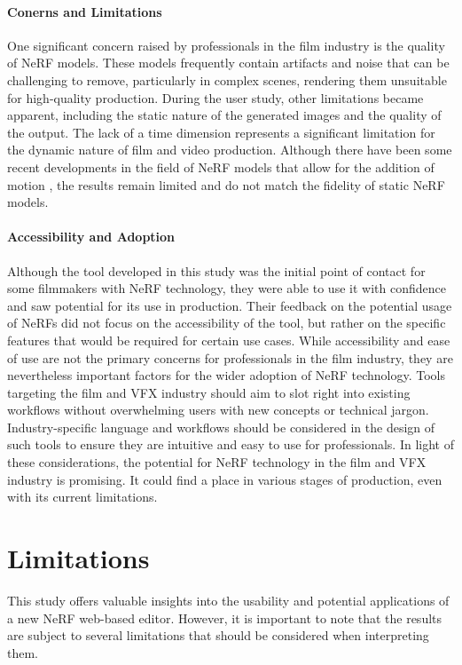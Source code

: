 \paragraph{Conerns and Limitations}
One significant concern raised by professionals in the film industry is the quality of NeRF models.
These models frequently contain artifacts and noise that can be challenging to remove, particularly in complex scenes, rendering them unsuitable for high-quality production.
During the user study, other limitations became apparent, including the static nature of the generated images and the quality of the output.
The lack of a time dimension represents a significant limitation for the dynamic nature of film and video production.
Although there have been some recent developments in the field of NeRF models that allow for the addition of motion  \cite{fridovich-keil_k-planes_2023}, the results remain limited and do not match the fidelity of static NeRF models.

\paragraph{Accessibility and Adoption}
Although the tool developed in this study was the initial point of contact for some filmmakers with NeRF technology, they were able to use it with confidence and saw potential for its use in production.
Their feedback on the potential usage of NeRFs did not focus on the accessibility of the tool, but rather on the specific features that would be required for certain use cases.
While accessibility and ease of use are not the primary concerns for professionals in the film industry, they are nevertheless important factors for the wider adoption of NeRF technology.
Tools targeting the film and VFX industry should aim to slot right into existing workflows without overwhelming users with new concepts or technical jargon.
Industry-specific language and workflows should be considered in the design of such tools to ensure they are intuitive and easy to use for professionals.
In light of these considerations, the potential for NeRF technology in the film and VFX industry is promising.
It could find a place in various stages of production, even with its current limitations.

\section{Limitations}
\label{sec:discussion:limitations}

This study offers valuable insights into the usability and potential applications of a new NeRF web-based editor. However, it is important to note that the results are subject to several limitations that should be considered when interpreting them.

